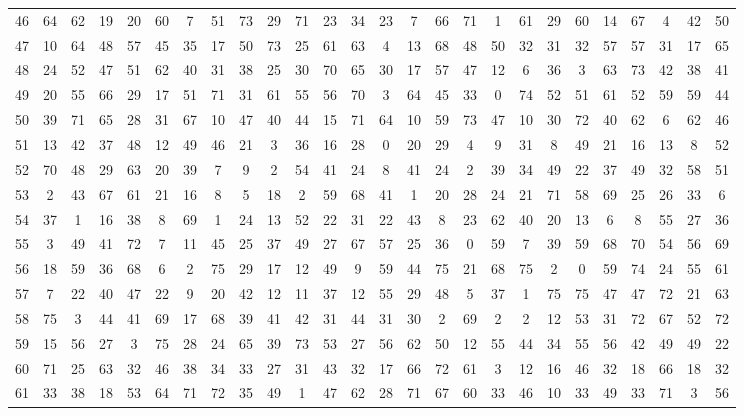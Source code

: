 \begin{table}
\begin{tabular}{c c c c c c c c c c c c c c c c c c c c c c c c c c }
46 & 64 & 62 & 19 & 20 & 60 & 7 & 51 & 73 & 29 & 71 & 23 & 34 & 23 & 7 & 66 & 71 & 1 & 61 & 29 & 60 & 14 & 67 & 4 & 42 & 50 \\
47 & 10 & 64 & 48 & 57 & 45 & 35 & 17 & 50 & 73 & 25 & 61 & 63 & 4 & 13 & 68 & 48 & 50 & 32 & 31 & 32 & 57 & 57 & 31 & 17 & 65 \\
48 & 24 & 52 & 47 & 51 & 62 & 40 & 31 & 38 & 25 & 30 & 70 & 65 & 30 & 17 & 57 & 47 & 12 & 6 & 36 & 3 & 63 & 73 & 42 & 38 & 41 \\
49 & 20 & 55 & 66 & 29 & 17 & 51 & 71 & 31 & 61 & 55 & 56 & 70 & 3 & 64 & 45 & 33 & 0 & 74 & 52 & 51 & 61 & 52 & 59 & 59 & 44 \\
50 & 39 & 71 & 65 & 28 & 31 & 67 & 10 & 47 & 40 & 44 & 15 & 71 & 64 & 10 & 59 & 73 & 47 & 10 & 30 & 72 & 40 & 62 & 6 & 62 & 46 \\
51 & 13 & 42 & 37 & 48 & 12 & 49 & 46 & 21 & 3 & 36 & 16 & 28 & 0 & 20 & 29 & 4 & 9 & 31 & 8 & 49 & 21 & 16 & 13 & 8 & 52 \\
52 & 70 & 48 & 29 & 63 & 20 & 39 & 7 & 9 & 2 & 54 & 41 & 24 & 8 & 41 & 24 & 2 & 39 & 34 & 49 & 22 & 37 & 49 & 32 & 58 & 51 \\
53 & 2 & 43 & 67 & 61 & 21 & 16 & 8 & 5 & 18 & 2 & 59 & 68 & 41 & 1 & 20 & 28 & 24 & 21 & 71 & 58 & 69 & 25 & 26 & 33 & 6 \\
54 & 37 & 1 & 16 & 38 & 8 & 69 & 1 & 24 & 13 & 52 & 22 & 31 & 22 & 43 & 8 & 23 & 62 & 40 & 20 & 13 & 6 & 8 & 55 & 27 & 36 \\
55 & 3 & 49 & 41 & 72 & 7 & 11 & 45 & 25 & 37 & 49 & 27 & 67 & 57 & 25 & 36 & 0 & 59 & 7 & 39 & 59 & 68 & 70 & 54 & 56 & 69 \\
56 & 18 & 59 & 36 & 68 & 6 & 2 & 75 & 29 & 17 & 12 & 49 & 9 & 59 & 44 & 75 & 21 & 68 & 75 & 2 & 0 & 59 & 74 & 24 & 55 & 61 \\
57 & 7 & 22 & 40 & 47 & 22 & 9 & 20 & 42 & 12 & 11 & 37 & 12 & 55 & 29 & 48 & 5 & 37 & 1 & 75 & 75 & 47 & 47 & 72 & 21 & 63 \\
58 & 75 & 3 & 44 & 41 & 69 & 17 & 68 & 39 & 41 & 42 & 31 & 44 & 31 & 30 & 2 & 69 & 2 & 2 & 12 & 53 & 31 & 72 & 67 & 52 & 72 \\
59 & 15 & 56 & 27 & 3 & 75 & 28 & 24 & 65 & 39 & 73 & 53 & 27 & 56 & 62 & 50 & 12 & 55 & 44 & 34 & 55 & 56 & 42 & 49 & 49 & 22 \\
60 & 71 & 25 & 63 & 32 & 46 & 38 & 34 & 33 & 27 & 31 & 43 & 32 & 17 & 66 & 72 & 61 & 3 & 12 & 16 & 46 & 32 & 18 & 66 & 18 & 32 \\
61 & 33 & 38 & 18 & 53 & 64 & 71 & 72 & 35 & 49 & 1 & 47 & 62 & 28 & 71 & 67 & 60 & 33 & 46 & 10 & 33 & 49 & 33 & 71 & 3 & 56 \\

\end{tabular}
\end{table}
